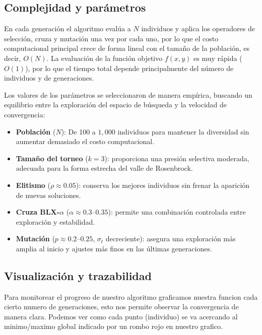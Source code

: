 \subsection{Complejidad y parámetros}
En cada generación el algoritmo evalúa a \(N\) individuos y aplica los operadores de selección, cruza y mutación una vez por cada uno, por lo que el costo computacional principal crece de forma lineal con el tamaño de la población, es decir, \(O(N)\). La evaluación de la función objetivo \(f(x,y)\) es muy rápida (\(O(1)\)), por lo que el tiempo total depende principalmente del número de individuos y de generaciones.

Los valores de los parámetros se seleccionaron de manera empírica, buscando un equilibrio entre la exploración del espacio de búsqueda y la velocidad de convergencia:
\begin{itemize}
    \item \textbf{Población} (\(N\)): De 100 a $1,000$ individuos para mantener la diversidad sin aumentar demasiado el costo computacional.
    \item \textbf{Tamaño del torneo} (\(k=3\)): proporciona una presión selectiva moderada, adecuada para la forma estrecha del valle de Rosenbrock.
    \item \textbf{Elitismo} (\(\rho\approx0.05\)): conserva los mejores individuos sin frenar la aparición de nuevas soluciones.
    \item \textbf{Cruza BLX-\(\alpha\)} (\(\alpha\approx0.3\text{--}0.35\)): permite una combinación controlada entre exploración y estabilidad.
    \item \textbf{Mutación} (\(p\approx0.2\text{--}0.25\), \(\sigma_t\) decreciente): asegura una exploración más amplia al inicio y ajustes más finos en las últimas generaciones.
\end{itemize}

\subsection{Visualización y trazabilidad}
Para monitorear el progreso de nuestro algoritmo graficamos nuestra funcion cada cierto numero de generaciones, esto nos permite observar la convergencia de manera clara.
Podemos ver como cada punto (individuo) se va acercando al minimo/maximo global indicado por un rombo rojo en nuestro grafico.

